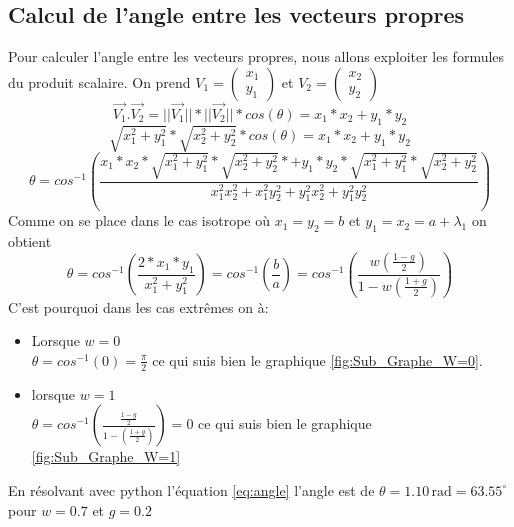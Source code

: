 \documentclass[12pt]{article}
\newcommand{\unit}[1]{\ensuremath{\, \mathrm{#1}}}
\begin{document}
\subsection{Calcul de l'angle entre les vecteurs propres}
Pour calculer l'angle entre les vecteurs propres, nous allons exploiter les formules du produit scalaire. On prend $V_1=\begin{pmatrix}
    x_{1}\\
    y_{1}
\end{pmatrix}$ et $V_2=\begin{pmatrix}
    x_{2}\\
    y_{2}
\end{pmatrix}$
\begin{equation}
    \overrightarrow{V_1}.\overrightarrow{V_2}=||\overrightarrow{V_1}||*||\overrightarrow{V_2}||*cos(\theta)=x_{1}*x_{2}+y_{1}*y_{2}
\end{equation}
\begin{equation}
    \sqrt{x_{1}^2+y_{1}^2}*\sqrt{x_{2}^2+y_{2}^2}*cos(\theta)=x_{1}*x_{2}+y_{1}*y_{2}
\end{equation}
\begin{equation}
    \theta=cos^{-1}\left(\frac{x_{1}*x_{2}*\sqrt{x_{1}^2+y_{1}^2}*\sqrt{x_{2}^2+y_{2}^2}*+y_{1}*y_{2}*\sqrt{x_{1}^2+y_{1}^2}*\sqrt{x_{2}^2+y_{2}^2}}{x_{1}^2 x_{2}^2 + x_{1}^2 y_{2}^2 + y_{1}^2 x_{2}^2 + y_{1}^2 y_{2}^2}\right)
\end{equation}
Comme on se place dans le cas isotrope où $x_{1}=y_{2}=b$ et $y_{1}=x_{2}=a+\lambda_1$ on obtient 
\begin{equation}
    \theta=cos^{-1}\left(\frac{2*x_{1}*y_{1}}{x_{1}^2 + y_{1}^2}\right)=cos^{-1}\left(\frac{b}{a} \right)=cos^{-1}\left(\frac{w\left(\frac{1-g}{2}\right)}{1-w\left(\frac{1+g}{2}\right)}\right)
    \label{eq:angle}
\end{equation}
C'est pourquoi dans les cas extrêmes on à:
\begin{itemize}
    \item Lorsque $w=0$ \\
$\theta=cos^{-1}\left(0\right)=\frac{\pi}{2}$ ce qui suis bien le graphique \ref{fig:Sub_Graphe_W=0}.
    \item lorsque $w=1$
    \\$\theta=cos^{-1}\left(\frac{\frac{1-g}{2}}{1-\left(\frac{1+g}{2}\right)}\right)=0$ ce qui suis bien le graphique \ref{fig:Sub_Graphe_W=1}
\end{itemize}
En résolvant avec python l'équation \ref{eq:angle} l'angle est de $\theta=1.10\unit{rad}=63.55^\circ$ pour $w=0.7$ et $g=0.2$
\end{document}
